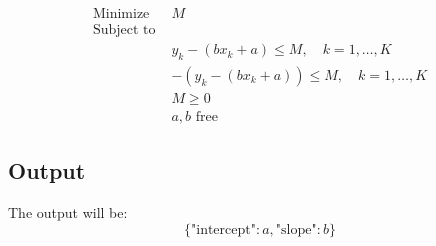\documentclass{article}
\begin{document}
\[
\begin{align*}
\text{Minimize } & M \\
\text{Subject to } & \\
& y_k - (bx_k + a) \leq M, \quad k = 1, \ldots, K \\
& -(y_k - (bx_k + a)) \leq M, \quad k = 1, \ldots, K \\
& M \geq 0 \\
& a, b \text{ free}
\end{align*}
\]

\subsection*{Output}
The output will be:
\[
\{
    \text{"intercept"}: a,
    \text{"slope"}: b
\}
\]
\end{document}
